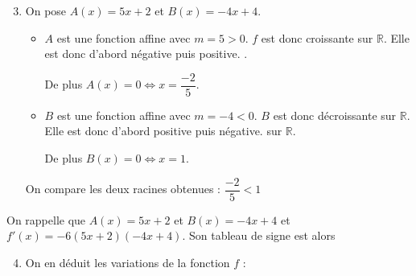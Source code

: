 \documentclass[15pt, mathserif]{beamer}
\begin{document}
 \begin{frame} 
 
 \begin{enumerate} 
 \setcounter{enumi}{2} 
 
 	 \item On pose $A(x)= 5x+2$ et $B(x) = -4x+4$.
 \bigskip 
 \begin{itemize}
	\item $A$ est une fonction affine avec $m =5>0$. $f$ est donc croissante sur $\mathbb{R}$. Elle est donc d'abord négative puis positive. .

	 De plus $A(x) = 0 \Leftrightarrow x = \dfrac{-2}{5}$. 
 \bigskip 
	\item $B$ est une fonction affine avec $m =-4<0$. $B$ est donc décroissante sur $\mathbb{R}$. Elle est donc d'abord positive puis négative. sur $\mathbb{R}$.

	 De plus $B(x) = 0 \Leftrightarrow x = 1$.
\end{itemize}
 On compare les deux racines obtenues : $ \dfrac{-2}{5} < 1$ 
 \end{enumerate} 
 
 \end{frame}


\begin{frame}On rappelle que $A(x) = 5x+2$ et $B(x) = -4x+4$ et $f'(x) = -6(5x+2)(-4x+4)$. Son tableau de signe est alors 

\medskip \hfil
{}

 \begin{enumerate} 
 \setcounter{enumi}{3} 
 	 \item On en déduit les variations de la fonction $f$ : 

  \medskip \hfil
{}

 \end{enumerate} 
 
\end{frame}
\end{document}
